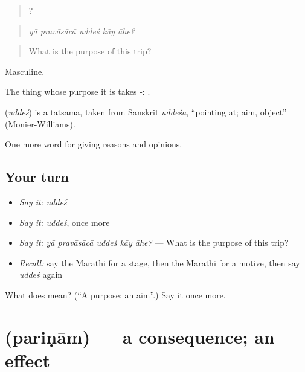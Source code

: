 \begin{quote}
    ?
\end{quote}

\begin{quote}
\emph{yā pravāsācā uddeś kāy āhe?}
\end{quote}

\begin{quote}
What is the purpose of this trip?
\end{quote}

Masculine.

The thing whose purpose it is takes -:  .

\begin{cousinweb}
\textbf{} (\emph{uddeś}) is a tatsama, taken from Sanskrit \emph{uddeśa}, \textquotedblleft{}pointing at; aim, object\textquotedblright{} (Monier-Williams).
\end{cousinweb}

\begin{grammarlens}[title={What you've built}]
One more word for giving reasons and opinions.
\end{grammarlens}

\subsection*{Your turn}
\begin{itemize}
\raggedright
  \item \emph{Say it:} \emph{uddeś}
  \item \emph{Say it:} \emph{uddeś}, once more
  \item \emph{Say it:} \emph{yā pravāsācā uddeś kāy āhe?} — What is the purpose of this trip?
  \item \emph{Recall:} say the Marathi for a stage, then the Marathi for a motive, then say \emph{uddeś} again
\end{itemize}

\begin{tcolorbox}[breakable,colback=teal!4,colframe=teal!35!black,title={Before you move on}]
What does  mean? (\textquotedblleft{}A purpose; an aim\textquotedblright{}.) Say it once more.
\end{tcolorbox}
\section[\texorpdfstring{\mr{परिणाम} (pariṇām)}{परिणाम (pariṇām)}]{ (pariṇām) — a consequence; an effect}

